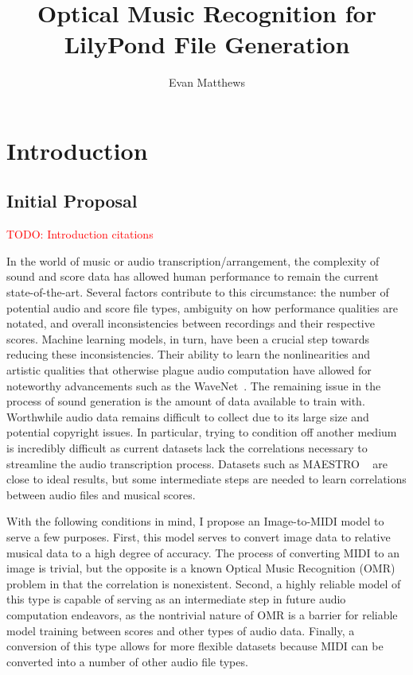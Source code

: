 \documentclass[review,sigconf]{acmart}
\newcommand{\todo}[1]{\textcolor{red}{TODO: #1}}
\begin{document}
\title[omr-lilypond-midi]{Optical Music Recognition for LilyPond File Generation}
\author{Evan Matthews}


\maketitle

\section{Introduction}
\subsection{Initial Proposal}
\todo{Introduction citations}
\cite{andrea2021note}

In the world of music or audio transcription/arrangement, the complexity of sound and score data has allowed human performance to remain the current state-of-the-art. 
Several factors contribute to this circumstance: the number of potential audio and score file types, ambiguity on how performance qualities are notated, and overall inconsistencies between recordings and their respective scores. 
Machine learning models, in turn, have been a crucial step towards reducing these inconsistencies. 
Their ability to learn the nonlinearities and artistic qualities that otherwise plague audio computation have allowed for noteworthy advancements such as the WaveNet~\cite{oord2016wavenet}. 
The remaining issue in the process of sound generation is the amount of data available to train with. 
Worthwhile audio data remains difficult to collect due to its large size and potential copyright issues. 
In particular, trying to condition off another medium is incredibly difficult as current datasets lack the correlations necessary to streamline the audio transcription process. 
Datasets such as MAESTRO ~\cite{hawthorne2018enabling} are close to ideal results, but some intermediate steps are needed to learn correlations between audio files and musical scores.

With the following conditions in mind, I propose an Image-to-MIDI model to serve a few purposes. First, this model serves to convert image data to relative musical data to a high degree of accuracy. The process of converting MIDI to an image is trivial, but the opposite is a known Optical Music Recognition (OMR) problem in that the correlation is nonexistent. 
Second, a highly reliable model of this type is capable of serving as an intermediate step in future audio computation endeavors, as the nontrivial nature of OMR is a barrier for reliable model training between scores and other types of audio data. 
Finally, a conversion of this type allows for more flexible datasets because MIDI can be converted into a number of other audio file types.
\end{document}
